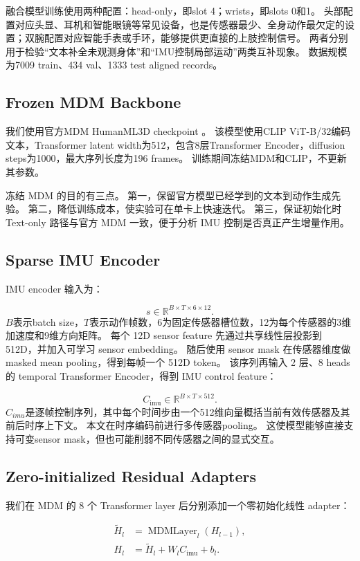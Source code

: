 融合模型训练使用两种配置：head-only，即slot 4；wrists，即slots 0和1。
头部配置对应头显、耳机和智能眼镜等常见设备，也是传感器最少、全身动作最欠定的设置；双腕配置对应智能手表或手环，能够提供更直接的上肢控制信号。
两者分别用于检验“文本补全未观测身体”和“IMU控制局部运动”两类互补现象。
数据规模为7009 train、434 val、1333 test aligned records。

\subsection{Frozen MDM Backbone}

我们使用官方MDM HumanML3D checkpoint \texttt{}。
该模型使用CLIP ViT-B/32编码文本，Transformer latent width为512，包含8层Transformer Encoder，diffusion steps为1000，最大序列长度为196 frames。
训练期间冻结MDM和CLIP，不更新其参数。

冻结 MDM 的目的有三点。
第一，保留官方模型已经学到的文本到动作生成先验。
第二，降低训练成本，使实验可在单卡上快速迭代。
第三，保证初始化时 Text-only 路径与官方 MDM 一致，便于分析 IMU 控制是否真正产生增量作用。

\subsection{Sparse IMU Encoder}

IMU encoder 输入为：

\[s\in\mathbb{R}^{B\times T\times6\times12}.\]
$B$表示batch size，$T$表示动作帧数，6为固定传感器槽位数，12为每个传感器的3维加速度和9维方向矩阵。
每个 12D sensor feature 先通过共享线性层投影到 512D，并加入可学习 sensor embedding。
随后使用 sensor mask 在传感器维度做 masked mean pooling，得到每帧一个 512D token。
该序列再输入 2 层、8 heads 的 temporal Transformer Encoder，得到 IMU control feature：

\[C_{\mathrm{imu}}\in\mathbb{R}^{B\times T\times512}.\]
$C_{imu}$是逐帧控制序列，其中每个时间步由一个512维向量概括当前有效传感器及其前后时序上下文。
本文在时序编码前进行多传感器pooling。
这使模型能够直接支持可变sensor mask，但也可能削弱不同传感器之间的显式交互。

\subsection{Zero-initialized Residual Adapters}

我们在 MDM 的 8 个 Transformer layer 后分别添加一个零初始化线性 adapter：

\begin{align}\widetilde H_l &= \operatorname{MDMLayer}_l(H_{l-1}),\\ H_l &= \widetilde H_l + W_l C_{\mathrm{imu}}+b_l.\end{align}

